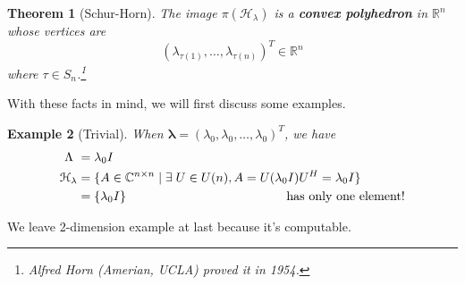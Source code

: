 \documentclass[11pt]{amsart}
\numberwithin{equation}{section}
\theoremstyle{plain}
\newtheorem{theorem}{Theorem}[section]
\newtheorem{eg}[theorem]{Example}
\theoremstyle{plain}
\numberwithin{equation}{section}
\theoremstyle{remark}
\begin{document}
\begin{theorem}[Schur-Horn]
	The image $\pi (\mathcal{H}_\lambda)$ is a \textbf{convex polyhedron} in $\mathbb{R}^n$ whose vertices are
	$$(\lambda_{\tau(1)},\ldots,\lambda_{\tau(n)})^T \in \mathbb{R}^n$$
	where $\tau \in S_n$.\footnote{Alfred Horn (Amerian, UCLA) proved it in 1954.}
\end{theorem}
With these facts in mind, we will first discuss some examples.
\begin{eg}[Trivial]
	When $\bm{\lambda} =(\lambda_0,\lambda_0,\ldots,\lambda_0)^T$, we have
\begin{align*}
	\Lambda \,\,&= \lambda_0 I \\
	\mathcal{H}_\lambda &= \{A \in \mathbb{C}^{n \times n} \mid 
	\exists\; U \in U(n), A=U(\lambda_0 I)U^H = \lambda_0 I\} \\
	 &=\{\lambda_0 I\} \hspace{4.5cm} \text{has only one element!}
\end{align*}	
\end{eg}
 We leave 2-dimension example at last because it’s computable.
\end{document}
